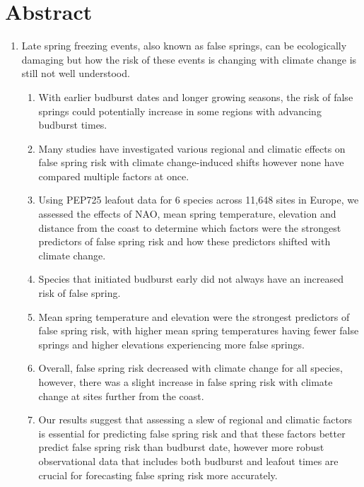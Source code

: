 \documentclass{article}\usepackage[]{graphicx}\usepackage[]{color}
\begin{document}
\section*{Abstract}
\begin{enumerate}
\item Late spring freezing events, also known as false springs, can be ecologically damaging but how the risk of these events is changing with climate change is still not well understood. 
  \begin{enumerate}
  \item With earlier budburst dates and longer growing seasons, the risk of false springs could potentially increase in some regions with advancing budburst times.
  \item Many studies have investigated various regional and climatic effects on false spring risk with climate change-induced shifts however none have compared multiple factors at once.
  \item Using PEP725 leafout data for 6 species across 11,648 sites in Europe, we assessed the effects of NAO, mean spring temperature, elevation and distance from the coast to determine which factors were the strongest predictors of false spring risk and how these predictors shifted with climate change. 
  \item Species that initiated budburst early did not always have an increased risk of false spring.
  \item Mean spring temperature and elevation were the strongest predictors of false spring risk, with higher mean spring temperatures having fewer false springs and higher elevations experiencing more false springs.
  \item Overall, false spring risk decreased with climate change for all species, however, there was a slight increase in false spring risk with climate change at sites further from the coast.
  \item Our results suggest that assessing a slew of regional and climatic factors is essential for predicting false spring risk and that these factors better predict false spring risk than budburst date, however more robust observational data that includes both budburst and leafout times are crucial for forecasting false spring risk more accurately.
  \end{enumerate}
\end{enumerate}
\end{document}
